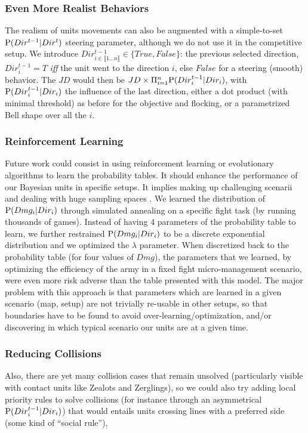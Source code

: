 \subsubsection{Even More Realist Behaviors}
The realism of units movements can also be augmented with a simple-to-set $\mathrm{P}(Dir^{t-1}|Dir^t)$ steering parameter, although we do not use it in the competitive setup. We introduce $Dir_{i \in \llbracket 1 \dots n\rrbracket }^{t-1} \in \{True, False\}$: the previous selected direction, $Dir_i^{t-1} = T$ \textit{iff} the unit went to the direction $i$, else $False$ for a steering (smooth) behavior. The $JD$ would then be $JD \times \Pi_{i=1}^{n} \mathrm{P}(Dir_i^{t-1} | Dir_i)$, with $\mathrm{P}(Dir_i^{t-1} | Dir_i)$ the influence of the last direction, either a dot product (with minimal threshold) as before for the objective and flocking, or a parametrized Bell shape over all the $i$.

\subsubsection{Reinforcement Learning}
Future work could consist in using reinforcement learning \citep{Sutton} or evolutionary algorithms \citep{SmithCIG10} to learn the probability tables. It should enhance the performance of our Bayesian units in specific setups. It implies making up challenging scenarii and dealing with huge sampling spaces \citep{Asmuth09}. We learned the distribution of $\mathrm{P}(Dmg_i | Dir_i)$ through simulated annealing on a specific fight task (by running thousands of games). Instead of having 4 parameters of the probability table to learn, we further restrained $\mathrm{P}(Dmg_i|Dir_i)$ to be a discrete exponential distribution and we optimized the $\lambda$ parameter. When discretized back to the probability table (for four values of $Dmg$), the parameters that we learned, by optimizing the efficiency of the army in a fixed fight micro-management scenario, were even more risk adverse than the table presented with this model. The major problem with this approach is that parameters which are learned in a given scenario (map, setup) are not trivially re-usable in other setups, so that boundaries have to be found to avoid over-learning/optimization, and/or discovering in which typical scenario our units are at a given time.

\subsubsection{Reducing Collisions}
Also, there are yet many collision cases that remain unsolved (particularly visible with contact units like Zealots and Zerglings), so we could also try adding local priority rules to solve collisions (for instance through an asymmetrical $\mathrm{P}(Dir_i^{t-1}|Dir_i)$) that would entails units crossing lines with a preferred side (some kind of ``social rule''),

